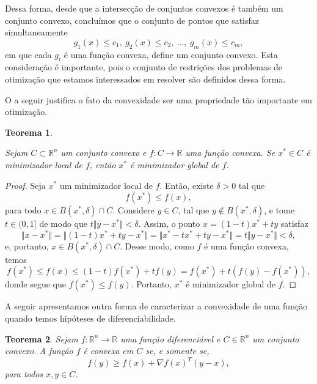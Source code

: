 \documentclass[12pt,a4paper]{scrartcl}
\def\RR{\mathds{R}}
\newtheorem{teo}{Teorema}
\theoremstyle{definition}%
\begin{document}
Dessa forma, desde que a intersecção de conjuntos convexos é também um conjunto convexo, concluímos que o conjunto de pontos que satisfaz simultaneamente
\[
g_{1}(x) \leq c_{1}, \ g_{2}(x) \leq c_{2}, \ \ldots, \ g_{m}(x) \leq c_{m} ,
\]
em que cada $g_{i}$ é uma função convexa, define um conjunto convexo. Esta consideração é importante, pois o conjunto de restrições dos problemas de otimização que estamos interessados em resolver são definidos dessa forma. 

O  a seguir justifica o fato da convexidade ser uma propriedade tão importante em otimização.

\begin{teo} \label{teo:convexidade_e_minimizador}

Sejam $C \subset \RR^{n}$ um conjunto convexo e $f:C \rightarrow \RR$ uma função convexa. Se $x^{*} \in C$ é minimizador local de $f$, então $x^{*}$ é minimizador global de $f$.
\end{teo}
\begin{proof}
Seja $x^{*}$ um minimizador local de $f$. Então, existe $\delta > 0$ tal que 
\[
f(x^{*}) \leq f(x), 
\]
para todo $x \in B(x^{*}, \delta) \cap C$. Considere $y \in C$, tal que $y \notin B(x^{*}, \delta)$, e tome $t \in (0,1]$ de modo que $t \Vert y-x^{*} \Vert < \delta$. Assim, o ponto $x = (1-t)x^{*} + ty$ satisfaz
\[
\Vert x - x^{*} \Vert = \Vert (1-t)x^{*} + ty - x^{*} \Vert = \Vert x^{*} - tx^{*} + ty - x^{*} \Vert = t \Vert y - x^{*} \Vert < \delta ,
\]
e, portanto, $x \in B(x^{*}, \delta) \cap C$.
Desse modo, como $f$ é uma função convexa, temos
\[
f(x^{*}) \leq f(x) \leq (1-t)f(x^{*}) + tf(y) = f(x^{*}) + t(f(y)-f(x^{*})),
\]
donde segue que $f(x^{*}) \leq f(y)$.
Portanto, $x^{*}$ é minimizador global de $f$.
\end{proof}

A seguir apresentamos outra forma de caracterizar a convexidade de uma função quando temos hipóteses de diferenciabilidade.

\begin{teo}  \label{teo:diferenciabilidade_e_convexidade}
Sejam $f: \RR^{n} \rightarrow \RR $ uma função diferenciável e $C \in \RR^{n}$ um conjunto convexo. A função $f$ é convexa em $C$ se, e somente se, 
\[
f(y) \geq f(x) + \nabla f(x)^{T}(y-x),
\]
para todos $x, y \in C$.
\end{teo}
\end{document}
